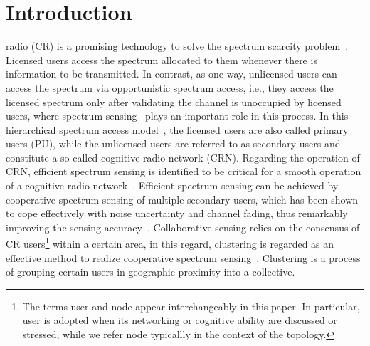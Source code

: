 \documentclass[10pt,journal,compsoc]{IEEEtran}
\theoremstyle{mytheoremstyle}
\theoremstyle{mytheoremstyle}
\theoremstyle{mytheoremstyle}
\newcommand{\ie}{i.e., }
\begin{document}
%
\IEEEpeerreviewmaketitle

\graphicspath{
{../figures/04_clutering/}
}


\section{Introduction}
\label{intro}
 radio (CR) is a promising technology to solve the spectrum scarcity problem~\cite{Mitola}.
Licensed users access the spectrum allocated to them whenever there is information to be transmitted.
In contrast, as one way, unlicensed users can access the spectrum via opportunistic spectrum access, \ie they access the licensed spectrum only after validating the channel is unoccupied by licensed users, where spectrum sensing~\cite{sensing_survey_2009} plays an important role in this process.
%
In this hierarchical spectrum access model~\cite{zhao_survey_DSA_2007}, the licensed users are also called primary users (PU), while the unlicensed users are referred to as secondary users and constitute a so called cognitive radio network (CRN).
%
Regarding the operation of CRN, efficient spectrum sensing is identified to be critical for a smooth operation of a cognitive radio network~\cite{Sahai_FundamentalDesignTradeoffs2006}.
Efficient spectrum sensing can be achieved by cooperative spectrum sensing of multiple secondary users, which has been shown to cope effectively with noise uncertainty and channel fading, thus remarkably improving the sensing accuracy~\cite{coorperativeSensing_Akyildiz11}.
Collaborative sensing relies on the consensus of CR users\footnote{The terms user and node appear interchangeably in this paper. In particular, user is adopted when its networking or cognitive ability are discussed or stressed, while we refer node typicallly in the context of the topology.} within a certain area, in this regard, clustering is regarded as an effective method to realize cooperative spectrum sensing~\cite{Sun07_clustering_spectrum_secsing, Zhao07}.
Clustering is a process of grouping certain users in geographic proximity into a collective.
\end{document}
